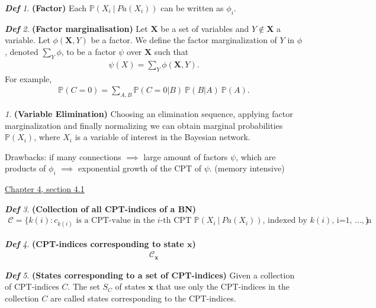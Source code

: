 \documentclass{amsart}
\theoremstyle{plain}
\theoremstyle{remark}
\newtheorem*{remark*}{}
\newtheorem*{definition*}{\textbf{\em Def}}
\theoremstyle{plain}
\renewcommand{\P}{{\mathbb P}}
\newcommand{\C}{{\mathcal C}}
\newcommand{\bfx}{{\mathbf{x}}}
\newcommand{\bfX}{{\mathbf{X}}}
\newcommand{\vs}{\vspace{0.75pc}}
\begin{document}
\begin{definition*}\textbf{ (Factor) }
Each $ \P(X_i\ |\ Pa(X_i))$ can be written as $\phi_i$.
\end{definition*}\vs

\begin{definition*}\textbf{ (Factor marginalisation) }
Let $\bfX$ be a set of variables and $Y \notin \bfX$ a variable. Let $\phi(\bfX,Y)$ be a factor. We define the factor marginalization of $Y$ in $\phi$, denoted $\sum_Y \phi$, to be a factor $\psi$ over $\bfX$ such that
\begin{align*}
\psi(X) = \sum_Y \phi(\bfX,Y).
\end{align*}
For example,
\begin{align*}
\P(C=0) = \sum_{A,B} \P(C=0 | B)\  \P(B | A)\ \P(A).
\end{align*}
\end{definition*}\vs

\begin{remark*}\textbf{(Variable Elimination)}
Choosing an elimination sequence, applying factor marginalization and finally normalizing we can obtain marginal probabilities $\P(X_i)$, where $X_i$ is a variable of interest in the Bayesian network.\vs

Drawbacks: if many connections $\implies$ large amount of factors $\psi$, which are products of $\phi_i$ $\implies$ exponential growth of the CPT of $\psi$. (memory intensive)
\end{remark*}\vs

\underline{Chapter 4, section 4.1} \\
\begin{definition*}\textbf{ (Collection of all CPT-indices of a BN) }
\begin{align*}
\C = \{ k(i): c_{k(i)} \text{ is a CPT-value in the $i$-th CPT $\P(X_i\ |\ Pa(X_i))$, indexed by $k(i)$, i=1, \ldots , n } \}
\end{align*}\vs
\end{definition*}\vs

\begin{definition*}\textbf{ (CPT-indices corresponding to state $\mathbf{x}$) }\begin{align*}
\C_\bfx
\end{align*}\vs
\end{definition*}\vs 

\begin{definition*}\textbf{ (States corresponding to a set of CPT-indices) }
Given a collection of CPT-indices $C$. The set $S_C$ of states $\bfx$ that use only the CPT-indices in the collection $C$ are called states corresponding to the CPT-indices.
\end{definition*}\vs 
\end{document}
